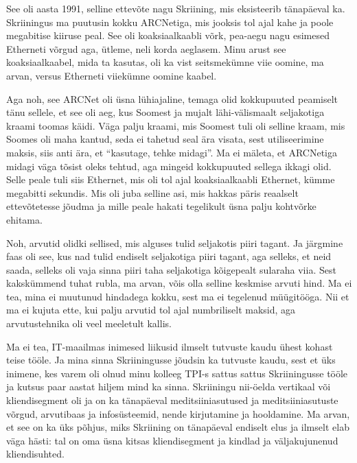 
See oli  aasta 1991, selline ettevõte nagu Skriining, mis 
eksisteerib tänapäeval ka. Skriiningus ma puutusin kokku ARCNetiga, mis jooksis 
tol ajal kahe ja poole megabitise kiiruse peal. See oli koaksiaalkaabli võrk, 
pea-aegu nagu esimesed Etherneti võrgud aga, ütleme, neli korda aeglasem. Minu 
arust see koaksiaalkaabel, mida ta kasutas, oli ka vist seitsmekümne viie 
oomine, ma arvan, versus Etherneti viiekümne oomine kaabel. 

Aga noh, see ARCNet oli  üsna lühiajaline, temaga olid kokkupuuted peamiselt  
tänu sellele, et see oli  aeg, kus Soomest ja mujalt lähi-välismaalt 
seljakotiga kraami toomas käidi. Väga palju kraami, mis Soomest tuli oli 
selline kraam, mis Soomes oli maha kantud, seda ei tahetud seal ära visata, 
sest  utiliseerimine maksis, siis anti ära, et \enquote{kasutage, tehke 
midagi}. Ma ei mäleta, et ARCNetiga midagi väga tõsist oleks tehtud, aga 
mingeid kokkupuuted sellega ikkagi olid. Selle peale tuli siis Ethernet, mis 
oli tol ajal koaksiaalkaabli Ethernet, kümme megabitti sekundis. Mis oli juba 
selline asi, mis hakkas päris reaalselt ettevõtetesse jõudma ja mille peale 
hakati tegelikult üsna palju  kohtvõrke ehitama.


Noh, arvutid olidki sellised, mis alguses tulid seljakotis piiri tagant. Ja 
järgmine faas oli see, kus  nad tulid endiselt seljakotiga piiri tagant, aga 
selleks, et neid saada, selleks oli vaja sinna piiri taha seljakotiga 
kõigepealt sularaha viia. Sest kakskümmend tuhat rubla, ma arvan, võis olla  
selline keskmise arvuti hind. Ma ei tea, mina ei muutunud hindadega kokku, sest 
ma ei tegelenud müügitööga. Nii et ma ei kujuta ette, kui palju  arvutid tol 
ajal  numbriliselt maksid, aga arvutustehnika oli veel meeletult kallis.


Ma ei tea, IT-maailmas inimesed liikusid ilmselt tutvuste kaudu ühest kohast 
teise tööle. Ja mina sinna Skriiningusse jõudsin ka  tutvuste 
kaudu, sest et üks inimene, kes varem oli olnud minu kolleeg TPI-s sattus 
sattus Skriiningusse tööle ja kutsus paar aastat hiljem mind ka sinna. 
Skriiningu nii-öelda vertikaal või kliendisegment oli ja on ka tänapäeval 
meditsiiniasutused ja meditsiiniasutuste võrgud, arvutibaas ja infosüsteemid, 
nende kirjutamine ja hooldamine. Ma arvan, et see on ka üks põhjus, miks 
Skriining on tänapäeval  endiselt elus ja ilmselt elab väga hästi: tal on oma 
üsna kitsas kliendisegment ja kindlad ja väljakujunenud kliendisuhted.

